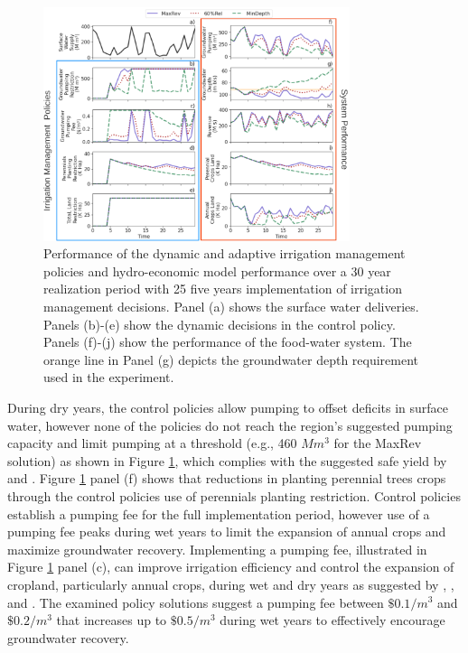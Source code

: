 \documentclass[a4paper,fleqn]{cas-sc}
\begin{document}
\begin{figure}[htp!]
    \includegraphics[width=0.8\textwidth,center]{./figs/selected_highsd_performance.png}
    \caption{Performance of the dynamic and adaptive irrigation management policies and hydro-economic model performance over a 30 year realization period with 25 five years implementation of irrigation management decisions. Panel (a) shows the surface water deliveries. Panels (b)-(e) show the dynamic decisions in the control policy. Panels (f)-(j) show the performance of the food-water system. The orange line in Panel (g) depicts the groundwater depth requirement used in the experiment.} \label{fig:6}
\end{figure}

During dry years, the control policies allow pumping to offset deficits in surface water, however none of the policies do not reach the region’s suggested pumping capacity and limit pumping at a threshold (e.g., 460 $M m^3$ for the MaxRev solution) as shown in Figure \ref{fig:6}, which complies with the suggested safe yield by \citet{miro_framework_2019} and \citet{macewan_hydroeconomic_2017}. Figure \ref{fig:6} panel (f) shows that reductions in planting perennial trees crops through the control policies use of perennials planting restriction. Control policies establish a pumping fee for the full implementation period, however use of a pumping fee peaks during wet years to limit the expansion of annual crops and maximize groundwater recovery. Implementing a pumping fee, illustrated in Figure \ref{fig:6} panel (c), can improve irrigation efficiency and control the expansion of cropland, particularly annual crops, during wet and dry years as suggested by \citet{stone_economic_2022}, \citet{graveline_combining_2020}, and \citet{khan_effect_2019}. The examined policy solutions suggest a pumping fee between $\$0.1/m^{3}$ and $\$0.2/m^{3}$ that increases up to $\$0.5/m^{3}$ during wet years to effectively encourage groundwater recovery.
\end{document}
